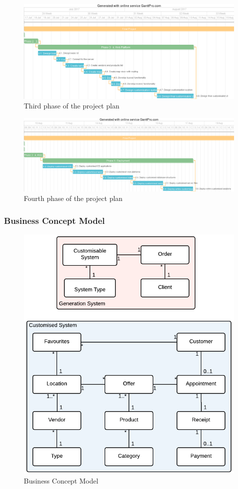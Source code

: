 \begin{figure}[!ht]
\centering
\includegraphics[scale=0.4]{img/phase3.png}
\caption{Third phase of the project plan}
\label{fig:phase3}
\end{figure}

\begin{figure}[!ht]
\centering
\includegraphics[scale=0.4]{img/phase4.png}
\caption{Fourth phase of the project plan}
\label{fig:phase4}
\end{figure}

\subsubsection{Business Concept Model}

\begin{figure}[!ht]
\centering
\includegraphics[scale=0.4]{img/Business_Concept_Model.png}
\caption{Business Concept Model}
\label{fig:business_concept_model}
\end{figure}
